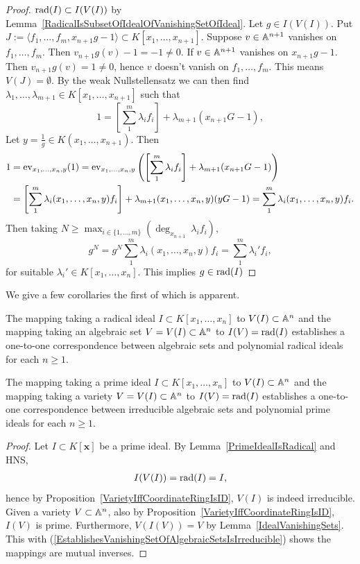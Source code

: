 \begin{proof}
    $\mathrm{rad}(I)\subset I(V(I))$ by Lemma~\ref{RadicalIsSubsetOfIdealOfVanishingSetOfIdeal}. Let $g\in I(V(I))$. Put $J:=\langle f_1,\dots,f_m,x_{n+1}g-1\rangle \subset K[x_1,\dots,x_{n+1}]$. Suppose $v\in \mathbb{A}^{n+1}$ vanishes on $f_1,\dots,f_m$. Then $v_{n+1}g(v)-1 = -1\neq0$. If $v\in \mathbb{A}^{n+1}$ vanishes on $x_{n+1}g-1$. Then $v_{n+1}g(v)=1\neq0$, hence $v$ doesn't vanish on $f_1,\dots,f_m$. This means $V(J)=\emptyset$. By the weak Nullstellensatz we can then find $\lambda_1,\dots,\lambda_{m+1}\in K[x_1,\dots,x_{n+1}]$ such that 
    $$1 = \left[ \sum_1^m \lambda_if_i\right]+\lambda_{m+1}(x_{n+1}G-1),$$
    Let $y = \frac{1}{g}\in K(x_1,\dots,x_{n+1})$. Then 
    \begin{align*} 1 &= \mathrm{ev}_{x_1,\dots,x_n,y}(1)= \mathrm{ev}_{x_1,\dots,x_n,y}\left( \left[ \sum_1^m \lambda_if_i\right]+\lambda_{m+1}(x_{n+1}G-1) \right)\\ 
    &= \left[ \sum_1^m \lambda_i(x_1,\dots,x_n,y)f_i\right]+\lambda_{m+1}(x_1,\dots,x_n,y)(yG-1) = \sum_1^m \lambda_i(x_1,\dots,x_n,y)f_i.
    \end{align*}
    Then taking $N\geq \max_{i\in\{1,\dots,m\}}(\deg_{x_{n+1}}\ \lambda_if_i),$
    $$g^N = g^N \sum_1^m \lambda_i(x_1,\dots,x_n,y)f_i = \sum_1^m \lambda_i'f_i,$$
    for suitable $\lambda_i'\in K[x_1,\dots,x_n]$. This implies $g\in \mathrm{rad}(I)$
\end{proof}
We give a few corollaries the first of which is apparent. 
\begin{corollary}
    The mapping taking a radical ideal $I\subset K[x_1,\dots,x_n]$ to $V(I)\subset \mathbb{A}^n$ and the mapping taking an algebraic set $V=V(I)\subset \mathbb{A}^n$ to $I(V)=\mathrm{rad}(I)$ establishes a one-to-one correspondence between algebraic sets and polynomial radical ideals for each $n\geq 1$.  
\end{corollary}
\begin{corollary}
    The mapping taking a prime ideal $I\subset K[x_1,\dots,x_n]$ to $V(I)\subset \mathbb{A}^n$ and the mapping taking a variety $V=V(I)\subset \mathbb{A}^n$ to $I(V)=\mathrm{rad}(I)$ establishes a one-to-one correspondence between irreducible algebraic sets and polynomial prime ideals for each $n\geq 1$.  
\end{corollary}
\begin{proof}
    Let $I\subset K[\mathbf{x}]$ be a prime ideal. By Lemma~\ref{PrimeIdealIsRadical} and HNS, \begin{align}\label{EstablishesVanishingSetOfAlgebraicSetsIsIrreducible}
        I(V(I))=\mathrm{rad}(I)=I,
    \end{align}
    hence by Proposition~\ref{VarietyIffCoordinateRingIsID}, $V(I)$ is indeed irreducible. Given a variety $V\subset \mathbb{A}^n$, also by Proposition~\ref{VarietyIffCoordinateRingIsID}, $I(V)$ is prime. Furthermore, $V(I(V))=V$ by Lemma~\ref{IdealVanishingSets}. This with (\ref{EstablishesVanishingSetOfAlgebraicSetsIsIrreducible}) shows the mappings are mutual inverses. 
\end{proof}
